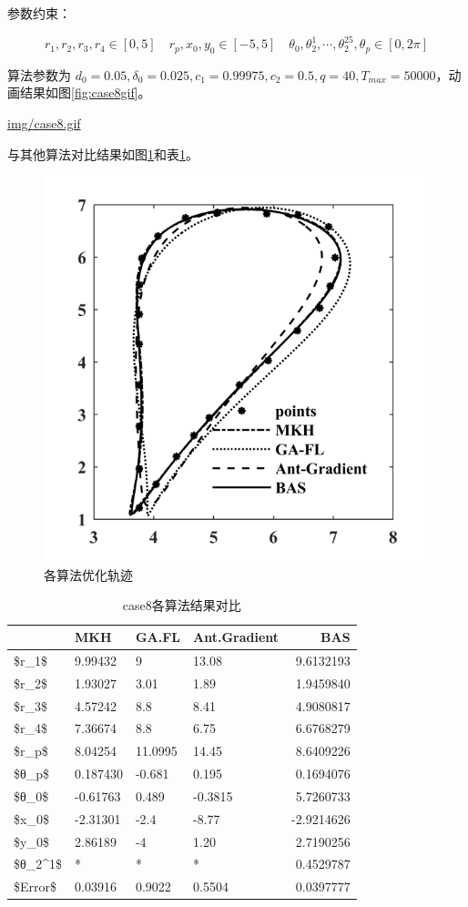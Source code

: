 \documentclass[]{ctexbook}
\theoremstyle{definition}
\theoremstyle{definition}
\theoremstyle{definition}
\theoremstyle{remark}
\begin{document}
参数约束：

\[
r_1,r_2,r_3,r_4\in[0,5]\quad r_p,x_0,y_0\in[-5,5] \quad \theta_0,\theta_2^1,\cdots,\theta_2^{25},\theta_p\in[0,2\pi]
\]

算法参数为
\(d_0 = 0.05,\delta_0=0.025,c_1=0.99975,c_2=0.5,q=40,T_{max}=50000\)，动画结果如图\ref{fig:case8gif}。

\url{img/case8.gif}

与其他算法对比结果如图\ref{fig:case8png}和表\ref{tab:case8table}。

\begin{figure}

{\centering \includegraphics[width=0.5\linewidth]{img/case8png} 

}

\caption{各算法优化轨迹}\label{fig:case8png}
\end{figure}

\begin{table}

\caption{\label{tab:case8table}case8各算法结果对比}
\centering
\begin{tabular}[t]{llllr}
\toprule
  & MKH & GA.FL & Ant.Gradient & BAS\\
\midrule
\$r\_1\$ & 9.99432 & 9 & 13.08 & 9.6132193\\
\$r\_2\$ & 1.93027 & 3.01 & 1.89 & 1.9459840\\
\$r\_3\$ & 4.57242 & 8.8 & 8.41 & 4.9080817\\
\$r\_4\$ & 7.36674 & 8.8 & 6.75 & 6.6768279\\
\$r\_p\$ & 8.04254 & 11.0995 & 14.45 & 8.6409226\\
\addlinespace
\$θ\_p\$ & 0.187430 & -0.681 & 0.195 & 0.1694076\\
\$θ\_0\$ & -0.61763 & 0.489 & -0.3815 & 5.7260733\\
\$x\_0\$ & -2.31301 & -2.4 & -8.77 & -2.9214626\\
\$y\_0\$ & 2.86189 & -4 & 1.20 & 2.7190256\\
\$θ\_2\textasciicircum{}1\$ & * & * & * & 0.4529787\\
\$Error\$ & 0.03916 & 0.9022 & 0.5504 & 0.0397777\\
\bottomrule
\end{tabular}
\end{table}
\end{document}
